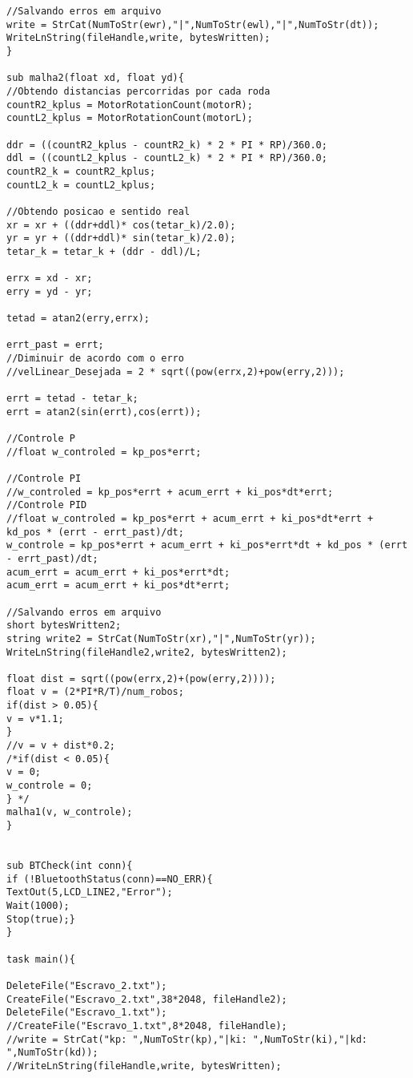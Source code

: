\begin{apendicesenv}
\begin{lstlisting}
//Salvando erros em arquivo
write = StrCat(NumToStr(ewr),"|",NumToStr(ewl),"|",NumToStr(dt));
WriteLnString(fileHandle,write, bytesWritten);
}

sub malha2(float xd, float yd){
//Obtendo distancias percorridas por cada roda
countR2_kplus = MotorRotationCount(motorR);
countL2_kplus = MotorRotationCount(motorL);

ddr = ((countR2_kplus - countR2_k) * 2 * PI * RP)/360.0;
ddl = ((countL2_kplus - countL2_k) * 2 * PI * RP)/360.0;
countR2_k = countR2_kplus;
countL2_k = countL2_kplus;

//Obtendo posicao e sentido real
xr = xr + ((ddr+ddl)* cos(tetar_k)/2.0);
yr = yr + ((ddr+ddl)* sin(tetar_k)/2.0);
tetar_k = tetar_k + (ddr - ddl)/L;

errx = xd - xr;
erry = yd - yr;

tetad = atan2(erry,errx);

errt_past = errt;
//Diminuir de acordo com o erro
//velLinear_Desejada = 2 * sqrt((pow(errx,2)+pow(erry,2)));

errt = tetad - tetar_k;
errt = atan2(sin(errt),cos(errt));

//Controle P
//float w_controled = kp_pos*errt;

//Controle PI
//w_controled = kp_pos*errt + acum_errt + ki_pos*dt*errt;
//Controle PID
//float w_controled = kp_pos*errt + acum_errt + ki_pos*dt*errt + kd_pos * (errt - errt_past)/dt;
w_controle = kp_pos*errt + acum_errt + ki_pos*errt*dt + kd_pos * (errt - errt_past)/dt;
acum_errt = acum_errt + ki_pos*errt*dt;
acum_errt = acum_errt + ki_pos*dt*errt;

//Salvando erros em arquivo
short bytesWritten2;
string write2 = StrCat(NumToStr(xr),"|",NumToStr(yr));
WriteLnString(fileHandle2,write2, bytesWritten2);

float dist = sqrt((pow(errx,2)+(pow(erry,2))));
float v = (2*PI*R/T)/num_robos;
if(dist > 0.05){
v = v*1.1;
}
//v = v + dist*0.2;
/*if(dist < 0.05){
v = 0;
w_controle = 0;
} */
malha1(v, w_controle);
}


sub BTCheck(int conn){
if (!BluetoothStatus(conn)==NO_ERR){
TextOut(5,LCD_LINE2,"Error");
Wait(1000);
Stop(true);}
}

task main(){

DeleteFile("Escravo_2.txt");
CreateFile("Escravo_2.txt",38*2048, fileHandle2);
DeleteFile("Escravo_1.txt");
//CreateFile("Escravo_1.txt",8*2048, fileHandle);
//write = StrCat("kp: ",NumToStr(kp),"|ki: ",NumToStr(ki),"|kd: ",NumToStr(kd));
//WriteLnString(fileHandle,write, bytesWritten);


\end{lstlisting}
\end{apendicesenv}
